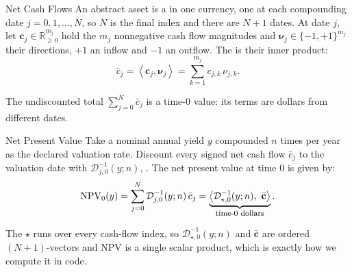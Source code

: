 \documentclass[aspectratio=169,11pt]{beamer}
\begin{document}
\begin{frame}{Net Cash Flows}
  An abstract asset is a \textbf{} in one
  currency, one at each compounding date $j=0,1,\ldots,N$, so $N$ is the final
  index and there are $N+1$ dates. At date $j$, let
  $\mathbf c_j\in\mathbb R_{\geq0}^{m_j}$ hold the $m_j$
  nonnegative cash flow magnitudes and $\symbf{\nu}_j\in\{-1,+1\}^{m_j}$ their directions,
  $+1$ an inflow and $-1$ an outflow. The  is their
  inner product:
  \[
    \bar c_j=\left\langle\mathbf c_j,\symbf{\nu}_j\right\rangle
    =\sum_{k=1}^{m_j}c_{j,k}\,\nu_{j,k}.
  \]

  The undiscounted total $\sum_{j=0}^{N}\bar c_j$ is \textbf{} a time-0
  value: its terms are dollars from different dates.

\end{frame}

\begin{frame}{Net Present Value}
  \vspace{0.2em}
  Take a nominal annual yield $y$ compounded $n$ times per year as the declared
  valuation rate. Discount every signed net cash flow $\bar c_j$ to the valuation
  date with $\mathcal D_{j,0}^{-1}(y;n)$, . The net present value
  at time $0$ is given by:
  \[
    \operatorname{NPV}_0(y)=\sum_{j=0}^{N}\mathcal D_{j,0}^{-1}(y;n)\,\bar c_j
    =\underbrace{\left\langle \mathcal D_{\star,0}^{-1}(y;n),\ \bar{\mathbf c}\right\rangle}_{\text{\footnotesize time-0 dollars}} .
  \]

  \vspace{0.2em}
  The $\star$ runs over every cash-flow index, so $\mathcal D_{\star,0}^{-1}(y;n)$
  and $\bar{\mathbf c}$ are ordered $(N+1)$-vectors and NPV is a single scalar
  product, which is exactly how we compute it in code.

\end{frame}
\end{document}
